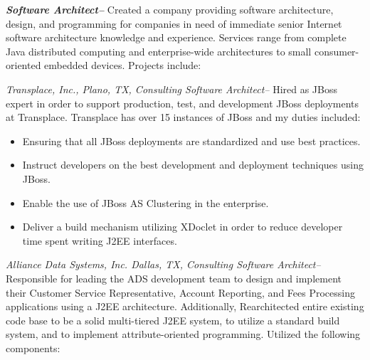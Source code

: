 \documentclass[10pt]{report}
\begin{document}
	\begin{description}

		\item{\bf{\emph{Software Architect--}}} Created a company providing software
		architecture, design, and programming for companies in need of immediate
		senior Internet software architecture knowledge and experience.   Services
		range from complete Java distributed computing and enterprise-wide
		architectures to small consumer-oriented embedded devices.  Projects
		include:

    	\begin{list}{-}{}

			\item{\emph{Transplace, Inc., Plano, TX, Consulting Software Architect--}}
			Hired as JBoss expert in order to support production, test, and
			development JBoss deployments at Transplace.  Transplace has over 15
			instances of JBoss and my duties included:

			\begin{itemize}

				\item Ensuring that all JBoss deployments are standardized and use best practices.

				\item Instruct developers on the best development and deployment techniques using JBoss.

				\item Enable the use of JBoss AS Clustering in the enterprise.

				\item Deliver a build mechanism utilizing XDoclet in order to reduce
				developer time spent writing J2EE interfaces.

			\end{itemize}

			\item{\emph{Alliance Data Systems, Inc. Dallas, TX, Consulting Software
			Architect--}}  Responsible for leading the ADS development team to design
			and implement their Customer Service Representative, Account Reporting,
			and Fees Processing applications using a J2EE architecture. Additionally,
			Rearchitected entire existing code base to be a solid multi-tiered J2EE
			system, to utilize a standard build system, and to implement
			attribute-oriented programming.  Utilized the following components:

			\begin{itemize}


\end{itemize}
\end{list}
\end{description}
\end{document}
